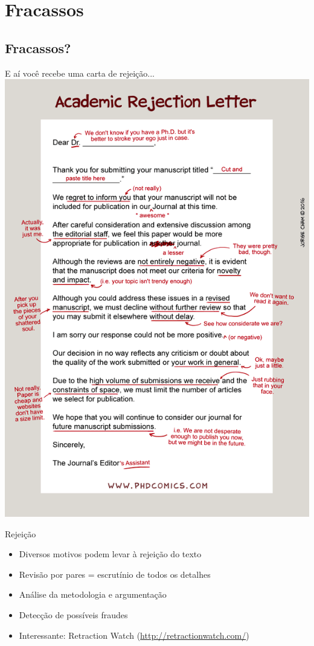 \documentclass{beamer}
\begin{document}
\section{Fracassos}

\subsection{Fracassos?}

\begin{frame}{E aí você recebe uma carta de rejeição...}
  \centering
  \includegraphics[height=\textheight]{Etapas/phd071316s}
\end{frame}

\begin{frame}{Rejeição}
  \begin{itemize}
  \item Diversos motivos podem levar à rejeição do texto
  \item Revisão por pares = escrutínio de todos os detalhes
  \item Análise da metodologia e argumentação
  \item Detecção de possíveis fraudes
  \item Interessante: Retraction Watch (\url{http://retractionwatch.com/})
  \end{itemize}
\end{frame}
\end{document}

